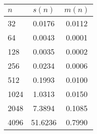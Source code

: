 \documentclass{article}
\begin{document}
\begin{enumerate}
\begin{enumerate}[label=\arabic*.]
\begin{tabular}{l|c|c}
                        $n$       & $s(n)$  & $m(n)$ \\
                        \hline 32 & 0.0176  & 0.0112 \\
                        64        & 0.0043  & 0.0001 \\
                        128       & 0.0035  & 0.0002 \\
                        256       & 0.0234  & 0.0006 \\
                        512       & 0.1993  & 0.0100 \\
                        1024      & 1.0313  & 0.0150 \\
                        2048      & 7.3894  & 0.1085 \\
                        4096      & 51.6236 & 0.7990
                    \end{tabular}
                    
          \end{enumerate}
\end{enumerate}
\end{document}
